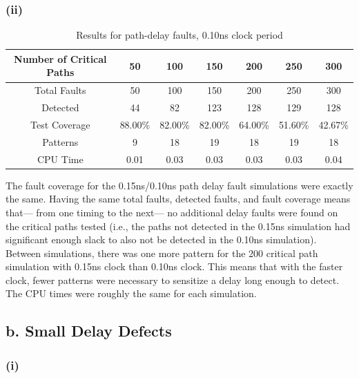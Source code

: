 \documentclass[letterpaper]{article} %
\begin{document}
\subsubsection*{(ii)}

\begin{table}[ht]
\centering
\begin{tabular}{|c|c|c|c|c|c|c|}
\hline
Number of Critical Paths & 50      & 100     & 150     & 200     & 250     & 300     \\ \hline
Total Faults             & 50      & 100     & 150     & 200     & 250     & 300     \\ \hline
Detected                 & 44      & 82      & 123     & 128     & 129     & 128     \\ \hline
Test Coverage            & 88.00\% & 82.00\% & 82.00\% & 64.00\% & 51.60\% & 42.67\% \\ \hline
Patterns                 & 9       & 18      & 19      & 18      & 19      & 18      \\ \hline
CPU Time                 & 0.01    & 0.03    & 0.03    & 0.03    & 0.03    & 0.04    \\ \hline
\end{tabular}
\caption{Results for path-delay faults, 0.10ns clock period}
\end{table}
The fault coverage for the 0.15ns/0.10ns path delay fault simulations were exactly the same. Having the same total faults, detected faults, and fault coverage means that--- from one timing to the next--- no additional delay faults were found on the critical paths tested (i.e., the paths not detected in the 0.15ns simulation had significant enough slack to also not be detected in the 0.10ns simulation). Between simulations, there was one more pattern for the 200 critical path simulation with 0.15ns clock than 0.10ns clock. This means that with the faster clock, fewer patterns were necessary to sensitize a delay long enough to detect. The CPU times were roughly the same for each simulation.

\subsection*{b. Small Delay Defects}
\subsubsection*{(i)}
\end{document}
